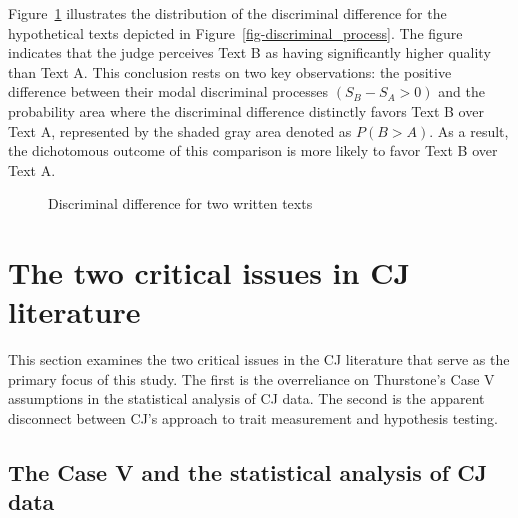 \documentclass[
  authoryear,
  preprint,
  1p]{elsarticle}
\begin{document}
Figure~\ref{fig-discriminal_difference} illustrates the distribution of
the discriminal difference for the hypothetical texts depicted in
Figure~\ref{fig-discriminal_process}. The figure indicates that the
judge perceives Text B as having significantly higher quality than Text
A. This conclusion rests on two key observations: the positive
difference between their modal discriminal processes
\((S_{B} - S_{A} > 0)\) and the probability area where the discriminal
difference distinctly favors Text B over Text A, represented by the
shaded gray area denoted as \(P(B > A)\). As a result, the dichotomous
outcome of this comparison is more likely to favor Text B over Text A.

\begin{figure}


\caption{\label{fig-discriminal_difference}Discriminal difference for
two written texts}

\end{figure}%

\section{The two critical issues in CJ
literature}\label{sec-theory-issues}

This section examines the two critical issues in the CJ literature that
serve as the primary focus of this study. The first is the overreliance
on Thurstone's Case V assumptions in the statistical analysis of CJ
data. The second is the apparent disconnect between CJ's approach to
trait measurement and hypothesis testing.

\subsection{The Case V and the statistical analysis of CJ
data}\label{sec-theory-issue1}
\end{document}
